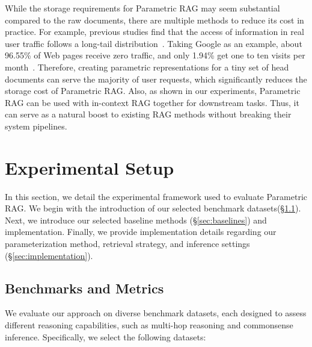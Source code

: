 \documentclass[sigconf,natbib=true,anonymous=false]{acmart}
\begin{document}
While the storage requirements for Parametric RAG may seem substantial compared to the raw documents, there are multiple methods to reduce its cost in practice.
For example, previous studies find that the access of information in real user traffic follows a long-tail distribution~\cite{silver1998}.
Taking Google as an example, about 96.55\% of Web pages receive zero traffic, and only 1.94\% get one to ten visits per month~\cite{soulo2023traffic}.
Therefore, creating parametric representations for a tiny set of head documents can serve the majority of user requests, which significantly reduces the storage cost of Parametric RAG.
Also, as shown in our experiments, Parametric RAG can be used with in-context RAG together for downstream tasks.
Thus, it can serve as a natural boost to existing RAG methods without breaking their system pipelines. 



\section{Experimental Setup}

In this section, we detail the experimental framework used to evaluate Parametric RAG. We begin with the introduction of our selected benchmark datasets(\S\ref{sec:benchmarks}). 
Next, we introduce our selected baseline methods (\S\ref{sec:baselines}) and implementation. 
Finally, we provide implementation details regarding our parameterization method, retrieval strategy, and inference settings (\S\ref{sec:implementation}).





\subsection{Benchmarks and Metrics}
\label{sec:benchmarks}
We evaluate our approach on diverse benchmark datasets, each designed to assess different reasoning capabilities, such as multi-hop reasoning and commonsense inference. Specifically, we select the following datasets:
\end{document}

